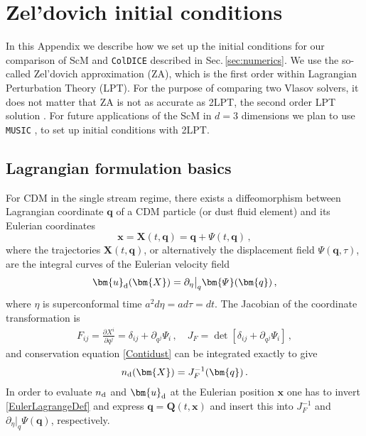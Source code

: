 \documentclass[twocolumn, nofootinbib, showpacs, superscriptaddress]{revtex4-1}
\newcommand{\NEW}[1]{#1}
\renewcommand{\d}[0]{{\rm{d}}}
\newcommand{\del}[0]{\partial }
\renewcommand{\v}[1]{\bm{#1} }
\newcommand{\vx}[0]{\bm{x} }
\newcommand{\vX}[0]{\bm{X} }
\newcommand{\vq}[0]{\bm{q} }
\newcommand{\vQ}[0]{\bm{Q} }
\newcommand{\vu}[0]{\bm{u} }
\begin{document}
\appendix

\section{Zel'dovich initial conditions}
\NEW{In this Appendix we describe how we set up the initial conditions for our comparison of ScM and \texttt{ColDICE} described in Sec.\,\ref{sec:numerics}. 
We use the so-called Zel'dovich approximation (ZA), which is the first order within Lagrangian Perturbation Theory (LPT).
For the purpose of comparing two Vlasov solvers, it does not matter that ZA is not as accurate as 2LPT, the second order LPT solution \cite{CroccePueblasScoccimarro2006,TatekawaMizuno2007}.
For future applications of the ScM in $d=3$ dimensions we plan to use \texttt{MUSIC} \cite{HahnAbel2011}, to set up initial conditions with 2LPT.}
 \label{sec:ZAini}
\subsection{Lagrangian formulation basics}
For CDM in the single stream regime, there exists a diffeomorphism between Lagrangian coordinate $\vq$ of a CDM particle (or dust fluid element) and its Eulerian coordinates 
\begin{equation} \label{EulerLagrangeDef}
\v{x}= \vX(t,\vq)= \vq + \v{\varPsi}(t,\vq)\,,
\end{equation}
 where the trajectories $\vX(t,\vq)$, or alternatively the displacement field $\v{\varPsi}(\vq,\tau)$, are the integral curves of the Eulerian velocity field
\begin{align}
\vu_\d(\vX) = \partial_{\eta}\big|_{q}\v{\varPsi}(\vq) \,, \label{defPsi}
\end{align}
where $\eta$ is superconformal time $a^2 d \eta = a d\tau = d t$.
The Jacobian of the coordinate transformation is
\begin{align} \label{Fij}
 F_{ij}=\frac{\del  X^i}{\del q^j} = \delta_{ij}+ \partial_{q^j}\varPsi_{i}\,, \quad  J_{ F}=\det\left[\delta_{ij}+ \partial_{q^j}\varPsi_{i}\right] \,,
\end{align}
and conservation equation \eqref{Contidust} can be integrated exactly to give
\begin{align}
n_\d(\vX)=J^{-1}_{ F}(\vq) \,.\label{JFtoDeltaCG}
\end{align}
In order to evaluate $n_\d$ and $\vu_\d$ at the Eulerian position $\v{x}$ one has to invert \eqref{EulerLagrangeDef} and express $\vq=\vQ(t,\vx)$ and insert this into  $J^{-1}_{ F}$ and $ \partial_{\eta}\big|_{q}\v{\varPsi}(\vq)$, respectively.
\end{document}
